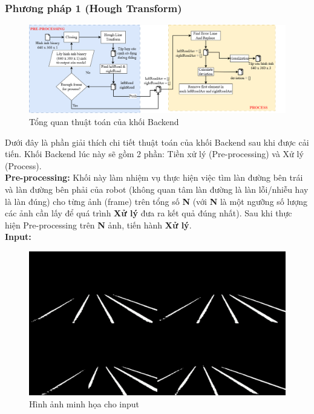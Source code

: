 \subsubsection{Phương pháp 1 (Hough Transform)}
\begin{figure}[h]
\begin{center}
 \includegraphics[width=18cm]{img/4_Implement/backend/Backend_imp.png}
 \caption{Tổng quan thuật toán của khối Backend}
 \label{back_end_cai_tien}
\end{center}
\end{figure}
\tab Dưới đây là phần giải thích chi tiết thuật toán của khối Backend sau khi được cải tiến. Khối Backend lúc này sẽ gồm 2 phần: Tiền xử lý (Pre-processing) và Xử lý (Process).\\
\tab \textbf{Pre-processing:} Khối này làm nhiệm vụ thực hiện việc tìm làn đường bên trái và làn đường bên phải của robot (không quan tâm làn đường là làn lỗi/nhiễu hay là làn đúng) cho từng ảnh (frame) trên tổng số \textbf{N} (với \textbf{N} là một ngưỡng số lượng các ảnh cần lấy để quá trình \textbf{Xử lý} đưa ra kết quả đúng nhất). Sau khi thực hiện Pre-processing trên \textbf{N} ảnh, tiến hành \textbf{Xử lý}.\\
\tab \textbf{Input:}
\begin{figure}[h]
    \centering
    \includegraphics[width = 12cm]{img/4_Implement/backend/input.png}
    \caption{Hình ảnh minh họa cho input}
\end{figure}
